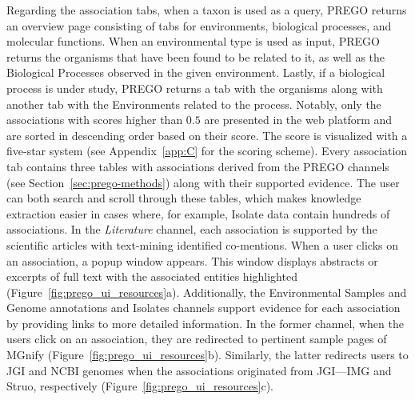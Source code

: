    Regarding the association tabs, when a taxon is used as a query, PREGO returns an overview page consisting of tabs for environments, biological processes, and molecular functions. When an environmental type is used as input, PREGO returns the organisms that have been found to be related to it, as well as the Biological Processes observed in the given environment. 
   Lastly, if a biological process is under study, PREGO returns a tab with the organisms along with another tab with the Environments related to the process. 
   Notably, only the associations with scores higher than $0.5$ are presented in the web platform and are sorted in descending order based on their score. 
   The score is visualized with a five-star system (see Appendix~\ref{app:C} for the scoring scheme).
   Every association tab contains three tables with associations derived from the PREGO channels (see Section~\ref{sec:prego-methods}) along with their supported evidence. 
   The user can both search and scroll through these tables, which makes knowledge extraction easier in cases where, for example, Isolate data contain hundreds of associations. 
   In the \textit{Literature} channel, each association is supported by the scientific articles with text-mining identified co-mentions. 
   When a user clicks on an association, a popup window appears. This window displays abstracts or excerpts of full text with the associated entities highlighted (Figure~\ref{fig:prego_ui_resources}a). 
   Additionally, the Environmental Samples and Genome annotations and Isolates channels support evidence for each association by providing links to more detailed information. 
   In the former channel, when the users click on an association, they are redirected to pertinent sample pages of MGnify (Figure~\ref{fig:prego_ui_resources}b). 
   Similarly, the latter redirects users to JGI and NCBI genomes when the associations originated from JGI—IMG and Struo, respectively (Figure~\ref{fig:prego_ui_resources}c).


